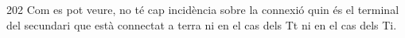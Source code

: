 \begin{exemple}[\ConnexWatt{}]
\begin{dingautolist}{202}
    Com es pot veure, no té cap incidència sobre la connexió quin és
    el terminal del secundari que està connectat a terra ni en el cas
    dels Tt ni en el cas dels Ti.
    \end{dingautolist}
\end{exemple}
